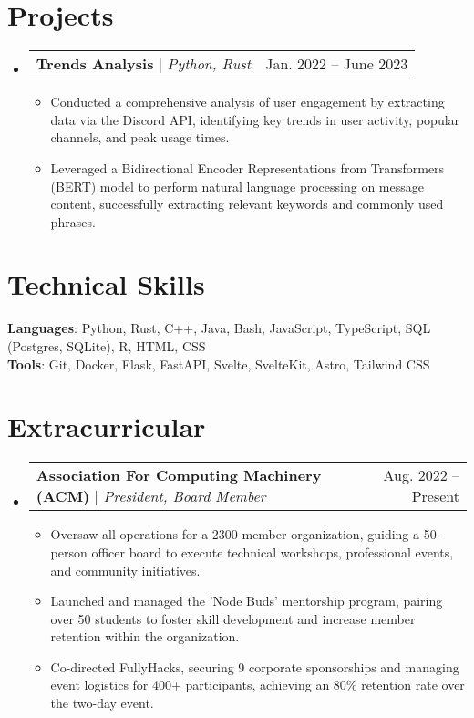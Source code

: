 \documentclass[letterpaper,11pt]{article}
\makeatletter
\newcommand{\resumeItem}[1]{
  \item\small{
    {#1 \vspace{-2pt}}
  }
}
\newcommand{\resumeProjectHeading}[2]{
    \item
    \begin{tabular*}{0.97\textwidth}{l@{\extracolsep{\fill}}r}
      \small#1 & #2 \\
    \end{tabular*}\vspace{-7pt}
}
\newcommand{\resumeSubHeadingListStart}{\begin{itemize}[leftmargin=0.15in, label={}]}
\newcommand{\resumeSubHeadingListEnd}{\end{itemize}}
\newcommand{\resumeItemListStart}{\begin{itemize}}
\newcommand{\resumeItemListEnd}{\end{itemize}\vspace{-5pt}}
\makeatother
\begin{document}
\section{Projects}
    \resumeSubHeadingListStart
        \resumeProjectHeading
              {\textbf{Trends Analysis} $|$ \emph{Python, Rust}}{Jan. 2022 -- June 2023}
              \resumeItemListStart
                \resumeItem{Conducted a comprehensive analysis of user engagement by extracting data via the Discord API, identifying key trends in user activity, popular channels, and peak usage times.}
                \resumeItem{Leveraged a Bidirectional Encoder Representations from Transformers (BERT)  model to perform natural language processing on message content, successfully extracting relevant keywords and commonly used phrases.}
              \resumeItemListEnd
    \resumeSubHeadingListEnd

\section{Technical Skills}
 \begin{itemize}[leftmargin=0.15in, label={}]
    \small{\item{
     \textbf{Languages}{: Python, Rust, C++, Java, Bash, JavaScript, TypeScript, SQL (Postgres, SQLite), R, HTML, CSS } \\
     \textbf{Tools}{: Git, Docker, Flask, FastAPI, Svelte, SvelteKit, Astro, Tailwind CSS} \\
    }}
 \end{itemize}

\section{Extracurricular}
    \resumeSubHeadingListStart
      \resumeProjectHeading
          {\textbf{Association For Computing Machinery (ACM) } $|$ \emph{President, Board Member}}{Aug. 2022 -- Present}
          \resumeItemListStart
            \resumeItem{Oversaw all operations for a 2300-member organization, guiding a 50-person officer board to execute technical workshops, professional events, and community initiatives.}
            \resumeItem{Launched and managed the 'Node Buds' mentorship program, pairing over 50 students to foster skill development and increase member retention within the organization.}
            \resumeItem{Co-directed FullyHacks, securing 9 corporate sponsorships and managing event logistics for 400+ participants, achieving an 80\% retention rate over the two-day event.}
          \resumeItemListEnd
    \resumeSubHeadingListEnd


\end{document}
